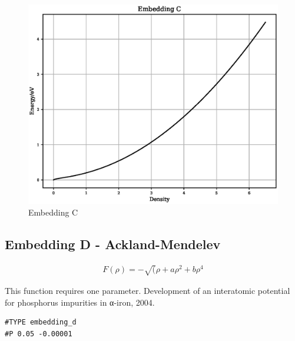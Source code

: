 \FloatBarrier
\begin{figure}[h]
  \begin{center}
    \includegraphics[scale=0.5]{appendix/functions/plots/embedding_c.eps}
    \caption{Embedding C}
    \label{graph:graph1}
  \end{center}
\end{figure}
\FloatBarrier








\subsection{Embedding D - Ackland-Mendelev}

\begin{equation}
\begin{split}
F(\rho) = -\sqrt({\rho} + a \rho^2 + b \rho^4
\end{split}
\label{eq:embeddingD}
\end{equation}

This function requires one parameter. 
Development of an interatomic potential for phosphorus impurities in α-iron, 2004.


\begin{lstlisting}[style=pseudocode,caption={Embedding D}]
#TYPE embedding_d
#P 0.05 -0.00001
\end{lstlisting}

